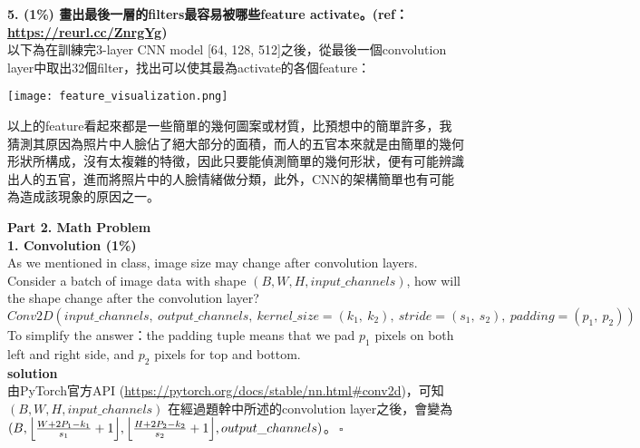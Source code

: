 \documentclass{article}
\DeclarePairedDelimiter\floor{\lfloor}{\rfloor}
\begin{document}
\bigskip

\noindent
{\bf 5. (1\%) 畫出最後一層的filters最容易被哪些feature activate。(ref：\\
\href{https://reurl.cc/ZnrgYg}{https://reurl.cc/ZnrgYg})}\\

以下為在訓練完3-layer CNN model [64, 128, 512]之後，從最後一個convolution layer中取出32個filter，找出可以使其最為activate的各個feature：\\

\begin{center}
    \texttt{[image: feature\_visualization.png]}\\
\end{center}

以上的feature看起來都是一些簡單的幾何圖案或材質，比預想中的簡單許多，我猜測其原因為照片中人臉佔了絕大部分的面積，而人的五官本來就是由簡單的幾何形狀所構成，沒有太複雜的特徵，因此只要能偵測簡單的幾何形狀，便有可能辨識出人的五官，進而將照片中的人臉情緒做分類，此外，CNN的架構簡單也有可能為造成該現象的原因之一。\\

\bigskip

\noindent
{\bf \LARGE Part 2. Math Problem}\\

\noindent
{\bf \Large 1. Convolution (1\%)}\\

As we mentioned in class, image size may change after convolution layers. Consider a batch of image data with shape $(B, W, H, input\_channels)$, how will the shape change after the convolution layer?\\

\noindent
$Conv2D (input\_channels,\ output\_channels,\ kernel\_size = (k_1,\ k_2),\ stride = (s_1,\ s_2),\ padding = (p_1,\ p_2))$\\

To simplify the answer：the padding tuple means that we pad $p_1$ pixels on both left and right side, and $p_2$ pixels for top and bottom.\\

\noindent
{\bf \large solution}\\

\noindent
由PyTorch官方API (\href{https://pytorch.org/docs/stable/nn.html#conv2d}{https://pytorch.org/docs/stable/nn.html#conv2d})，可知 $(B, W, H, input\_channels)$ 在經過題幹中所述的convolution layer之後，會變為\\
$(B, \floor*{\frac{W + 2 P_1 - k_1}{s_1} + 1}, \floor*{\frac{H + 2 P_2 - k_2}{s_2} + 1}, output\_channels)$。$\ \square$\\
\end{document}
